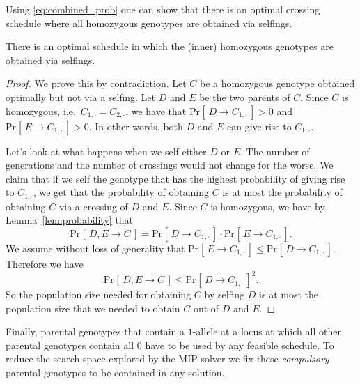 \documentclass[runningheads]{llncs}
\renewcommand{\Pr}[2][]{\mathrm{Pr}_{#1} [\, #2 \, ]}
\begin{document}
Using \eqref{eq:combined_prob} one can show that there is an optimal crossing schedule where all homozygous genotypes are obtained via selfings. 
\begin{lemma}
\label{lem:selfing}
There is an optimal schedule in which the (inner) homozygous genotypes are obtained via selfings.
\end{lemma}
\begin{proof}
We prove this by contradiction. Let $C$ be a homozygous genotype obtained
optimally but not via a selfing. Let $D$ and $E$ be the two parents of $C$.
Since $C$ is homozygous, i.e.\ $C_{1,\cdot} = C_{2,\cdot}$, we have that $\Pr{D \rightarrow
C_{1,\cdot}} > 0$ and $\Pr{E \rightarrow C_{1,\cdot}} > 0$. In other words, both $D$ and $E$ can
give rise to $C_{1,\cdot}$.

Let's look at what happens when we self either $D$ or $E$. The number of
generations and the number of crossings would not change for the worse. 
We claim that if we self the genotype that has the highest probability of 
giving rise to $C_{1,\cdot}$, we get that the probability of obtaining $C$ is at most the probability of obtaining $C$ via a crossing of $D$ and $E$.
Since $C$ is homozygous, we have by Lemma~\ref{lem:probability} that
\[
\Pr{D,E \rightarrow C} = \Pr{D \rightarrow C_{1,\cdot}} \cdot \Pr{E \rightarrow C_{1,\cdot}}.
\]
We assume without loss of generality that $\Pr{E \rightarrow C_{1,\cdot}} \leq \Pr{D \rightarrow C_{1,\cdot}}$. Therefore we have
\[
\Pr{D,E \rightarrow C} \leq \Pr{D \rightarrow C_{1,\cdot}}^2.
\]
So the population size needed for obtaining $C$ by selfing $D$ is at most the
population size that we needed to obtain $C$ out of $D$ and $E$. 
\end{proof}


Finally, parental genotypes that contain a $1$-allele at a locus at which all other parental genotypes contain all $0$ have to be used by any feasible schedule. To reduce the search space explored by the MIP solver we fix these \emph{compulsory} parental genotypes to be contained in any solution.
\end{document}
